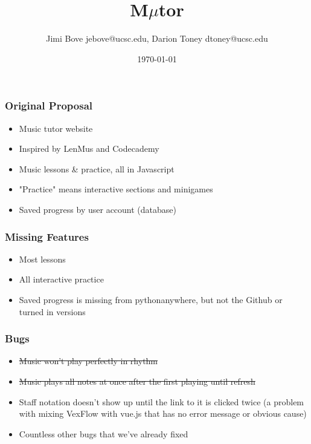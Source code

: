 \documentclass[24pt]{beamer}
\title{M$\mu$tor}
\author{Jimi Bove jebove@ucsc.edu, Darion Toney dtoney@ucsc.edu}
\date{\today}
\begin{document}
\maketitle

\begin{frame}
\frametitle{Original Proposal}
\begin{itemize}
  \item Music tutor website
  \item Inspired by LenMus and Codecademy
  \item Music lessons \& practice, all in Javascript
  \item "Practice" means interactive sections and minigames
  \item Saved progress by user account (database)
\end{itemize}
\end{frame}

\begin{frame}
\frametitle{Missing Features}
\begin{itemize}
  \item Most lessons
  \item All interactive practice
  \item Saved progress is missing from pythonanywhere, but not the Github or turned in versions
\end{itemize}
\end{frame}

\begin{frame}
\frametitle{Bugs}
\begin{itemize}
  \item \sout{Music won't play perfectly in rhythm}
  \item \sout{Music plays all notes at once after the first playing until refresh}
  \item Staff notation doesn't show up until the link to it is clicked twice (a problem with mixing VexFlow with vue.js that has no error message or obvious cause)
  \item Countless other bugs that we've already fixed
\end{itemize}
\end{frame}
\end{document}
